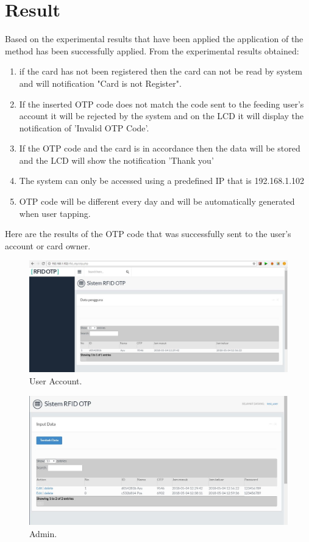 \section{Result}
\label{Result}
Based on the experimental results that have been applied the application of the method has been successfully applied.
From the experimental results obtained:
\begin{enumerate}
    \item 
    if the card has not been registered then the card can not be read by system and will notification "Card is not Register".
    \item
    If the inserted OTP code does not match the code sent to the feeding user's account it will be rejected by the system and on the LCD it will display the notification of 'Invalid OTP Code'.
    \item
    If the OTP code and the card is in accordance then the data will be stored and the LCD will show the notification 'Thank you'
    \item
    The system can only be accessed using a predefined IP that is 192.168.1.102
    \item
    OTP code will be different every day and will be automatically generated when user tapping.
\end{enumerate}

Here are the results of the OTP code that was successfully sent to the user's account or card owner.
\begin{figure}[ht]
\begin{center}
\includegraphics[width=12cm]{figures/OTP1.JPG}
\end{center}
\caption{User Account.
\label{eq:30}}
\end{figure}  

\begin{figure}[ht]
\begin{center}
\includegraphics[width=12cm]{figures/AdminOTP.JPG}
\end{center}
\caption{Admin.
\label{eq:30}}
\end{figure}  



